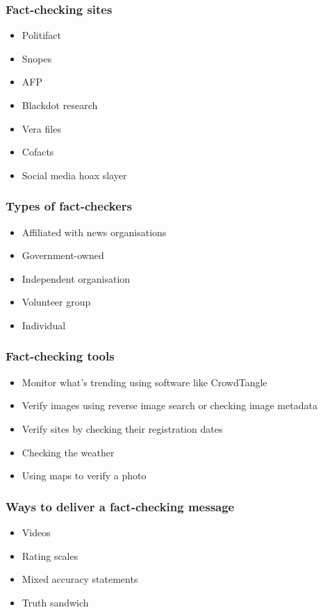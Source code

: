 \documentclass[11pt]{article}
\begin{document}
\subsubsection{Fact-checking sites}
\label{sec:org63d62de}
\begin{itemize}
\item Politifact
\item Snopes
\item AFP
\item Blackdot research
\item Vera files
\item Cofacts
\item Social media hoax slayer
\end{itemize}

\subsubsection{Types of fact-checkers}
\label{sec:orga94780f}
\begin{itemize}
\item Affiliated with news organisations
\item Government-owned
\item Independent organisation
\item Volunteer group
\item Individual
\end{itemize}

\subsubsection{Fact-checking tools}
\label{sec:orge601930}
\begin{itemize}
\item Monitor what's trending using software like CrowdTangle
\item Verify images using reverse image search or checking image metadata
\item Verify sites by checking their registration dates
\item Checking the weather
\item Using maps to verify a photo
\end{itemize}

\subsubsection{Ways to deliver a fact-checking message}
\label{sec:orga11ed42}
\begin{itemize}
\item Videos
\item Rating scales
\item Mixed accuracy statements
\item Truth sandwich
\end{itemize}
\end{document}
